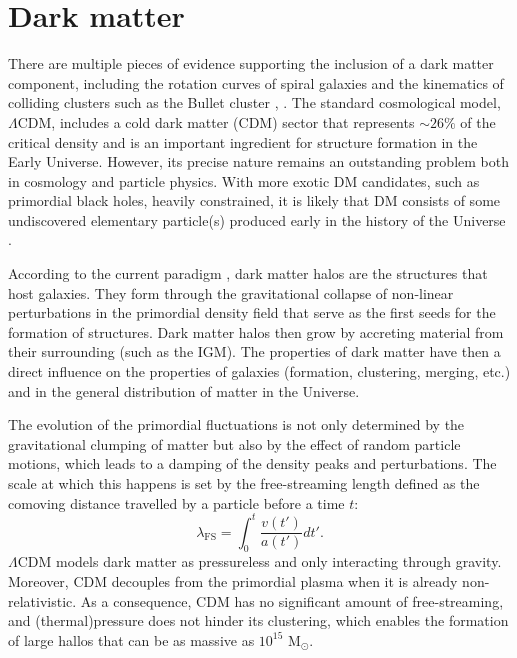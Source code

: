 \section{Dark matter}\label{sec:DM}
There are multiple pieces of evidence supporting the inclusion of a dark matter component, including the rotation curves of spiral galaxies and the kinematics of colliding clusters such as the Bullet cluster \cite{Navarro1996}, \cite{de_Blok_2008}. The standard cosmological model, $\Lambda$CDM, includes a cold dark matter (CDM) sector that represents $\sim 26 \%$ of the critical density \cite{planck2014} and is an important ingredient for structure formation in the Early Universe.
However, its precise nature remains an outstanding problem both in cosmology and particle physics. With more exotic DM candidates, such as primordial black holes, heavily constrained, it is likely that DM consists of some undiscovered elementary particle(s) produced early in the history of the Universe \cite{Villanueva_Domingo_2021}.

According to the current paradigm \cite{Mo2010}, dark matter halos are the structures that host galaxies. They form through the gravitational collapse of non-linear perturbations in the primordial density field that serve as the first seeds for the formation of structures. Dark matter halos then grow by accreting material from their surrounding (such as the IGM). The properties of dark matter have then a direct influence on the properties of galaxies (formation, clustering, merging, etc.) and in the general distribution of matter in the Universe.

The evolution of the primordial fluctuations is not only determined by the gravitational clumping of matter but also by
the effect of random particle motions, which leads to a damping of the density peaks and perturbations. The scale at which this happens is set by the free-streaming length defined as the comoving distance travelled by a particle before a time $t$:
\begin{equation}
    \lambda_\mathrm{FS}=\int_0^t\frac{v(t')}{a(t')}dt'.
\end{equation}
$\Lambda$CDM models dark matter as pressureless and only interacting through gravity. Moreover, CDM decouples from the primordial plasma when it is already non-relativistic.
As a consequence, CDM has no significant amount of free-streaming, and (thermal)pressure does not hinder its clustering, which enables the formation of large hallos that can be as massive as $10^{15}$ M$_\odot$.

